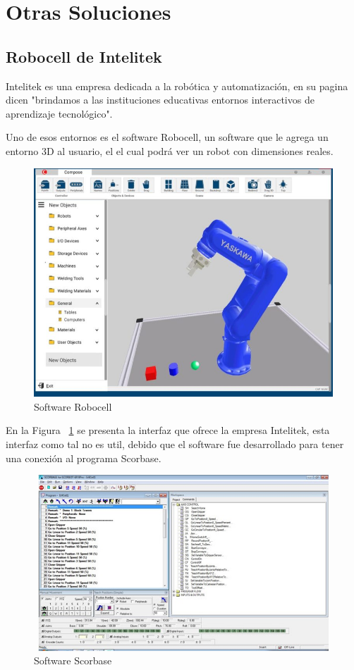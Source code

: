 \section{Otras Soluciones}
\subsection{Robocell de Intelitek}
Intelitek es una empresa dedicada a la robótica y automatización, en su pagina dicen "brindamos a las instituciones educativas entornos interactivos de aprendizaje tecnológico". 

Uno de esos entornos es el software Robocell, un software que le agrega un entorno 3D al usuario, el el cual podrá ver un robot con dimensiones reales.
\begin{figure}[ht]
\centering
\includegraphics[width=13cm]{figures/Robocell-768x588-1.jpg}
\caption{Software Robocell}
\label{fig:robocell}
\end{figure}

En la Figura ~\ref{fig:robocell} se presenta la interfaz que ofrece la empresa Intelitek, esta interfaz como tal no es util, debido que el software fue desarrollado para tener una conexión al programa Scorbase.

\clearpage

\begin{figure}[ht]
\centering
\includegraphics[width=13cm, height=6.6cm]{figures/eL_RBTC_P_ScorbaseControllerUSBPro_644x350.jpg}
\caption{Software Scorbase}
\label{fig:scorbase}
\end{figure}

